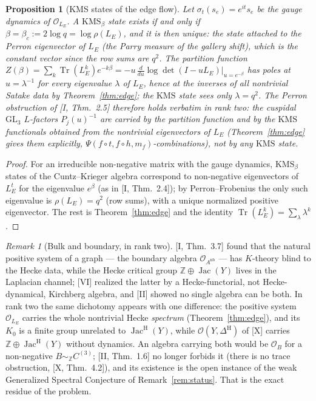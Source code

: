 \documentclass[11pt]{amsart}
\numberwithin{equation}{section}
\newtheorem{proposition}[theorem]{Proposition}
\theoremstyle{definition}
\theoremstyle{remark}
\newtheorem{remark}[theorem]{Remark}
\newcommand{\Z}{\mathbb{Z}}
\newcommand{\cO}{\mathcal{O}}
\newcommand{\Jac}{\operatorname{Jac}}
\newcommand{\Tr}{\operatorname{Tr}}
\newcommand{\DeltaH}{\Delta^{\mathrm{H}}}
\newcommand{\JacH}{\Jac^{\mathrm{H}}}
\newcommand{\Cthree}{C^{(3)}}
\newcommand{\LE}{L_{E}}
\newcommand{\SE}{\sim_{\Z}}
\newcommand{\Anb}{A^{\mathrm{nb}}}
\newcommand{\KMS}{\mathrm{KMS}}
\begin{document}
\begin{proposition}[KMS states of the edge flow]\label{prop:kms}
Let $\sigma_t(s_e)=e^{it}s_e$ be the gauge dynamics of $\cO_{\LE}$. A $\KMS_\beta$ state exists
if and only if $\beta=\beta_c:=2\log q=\log\rho(\LE)$, and it is then unique: the state
attached to the Perron eigenvector of $\LE$ (the Parry measure of the gallery shift), which
is the constant vector since the row sums are $q^{2}$. The partition function
$Z(\beta)=\sum_k\Tr(\LE^{k})e^{-k\beta}=-u\,\frac{d}{du}\log\det(I-u\LE)\big|_{u=e^{-\beta}}$
has poles at $u=\lambda^{-1}$ for every eigenvalue $\lambda$ of $\LE$, hence at the inverses
of all nontrivial Satake data by Theorem~\ref{thm:edge}; the $\KMS$ \emph{state} sees only
$\lambda=q^{2}$. The Perron obstruction of {\rm[I, Thm.~2.5]} therefore holds verbatim in rank
two: the cuspidal $\mathrm{GL}_3$ $L$-factors $P_j(u)^{-1}$ are carried by the partition
function and by the $\KMS$ functionals obtained from the nontrivial eigenvectors of
$\LE$ (Theorem~\ref{thm:edge} gives them explicitly, $\Psi(f\circ t,f\circ h,m_f)$-combinations),
not by any $\KMS$ state.
\end{proposition}

\begin{proof}
For an irreducible non-negative matrix with the gauge dynamics, $\KMS_\beta$ states of the
Cuntz--Krieger algebra correspond to non-negative eigenvectors of $\LE^{t}$ for the
eigenvalue $e^{\beta}$ (as in [I, Thm.~2.4]); by Perron--Frobenius the only such eigenvalue is
$\rho(\LE)=q^{2}$ (row sums), with a unique normalized positive eigenvector. The rest is
Theorem~\ref{thm:edge} and the identity $\Tr(\LE^{k})=\sum_\lambda\lambda^{k}$.
\end{proof}

\begin{remark}[Bulk and boundary, in rank two]\label{rem:dichotomy}
[I, Thm.~3.7] found that the natural positive system of a graph --- the boundary algebra
$\cO_{\Anb}$ --- has $K$-theory blind to the Hecke data, while the Hecke critical group
$\Z\oplus\Jac(Y)$ lives in the Laplacian channel; [VI] realized the latter by a
Hecke-functorial, not Hecke-dynamical, Kirchberg algebra, and [II] showed no single algebra
can be both. In rank two the same dichotomy appears with one difference: the positive
system $\cO_{\LE}$ carries the whole nontrivial Hecke \emph{spectrum} (Theorem~\ref{thm:edge}),
and its $K_0$ is a finite group unrelated to $\JacH(Y)$, while $\cO(Y,\DeltaH)$ of [X] carries
$\Z\oplus\JacH(Y)$ without dynamics. An algebra carrying both would be $\cO_B$ for a
non-negative $B\SE\Cthree$; [II, Thm.~1.6] no longer forbids it (there is no trace
obstruction, [X, Thm.~4.2]), and its existence is the open instance of the weak Generalized
Spectral Conjecture of Remark~\ref{rem:status}. That is the exact residue of the problem.
\end{remark}
\end{document}
